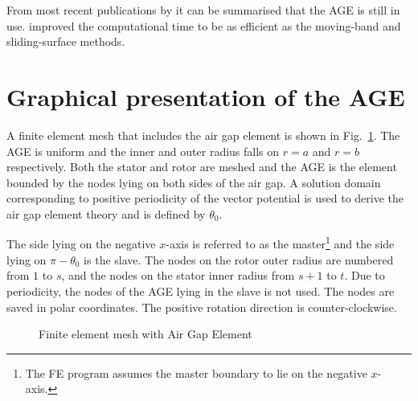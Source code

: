 From most recent publications by \cite{kalokirsis_2005} it can be summarised that the AGE is still 
in use. \cite{de_gersem_2005} improved the computational time to be as efficient as the moving-band 
and sliding-surface methods.

\section{Graphical presentation of the AGE}\label{sec:AGE_element}
A finite element mesh that includes the air gap element is shown in Fig.~\ref{fig:f_mesh}. The AGE 
is uniform and the inner and outer radius falls on $r = a$ and $r = b$ respectively. Both the stator 
and rotor are meshed and the AGE is the element bounded by the nodes lying on both sides of the air 
gap. A solution domain corresponding to positive periodicity of the vector potential is used to derive 
the air gap element theory and is defined by $\theta_0$.

The side lying on the negative $x$-axis is referred to as the master\footnote{The FE program assumes 
the master boundary to lie on the negative $x$-axis.} and the side lying on $\pi-\theta_0$ is the 
slave. The nodes on the rotor outer radius are numbered from $1$ to $s$, and the nodes on the stator 
inner radius from $s+1$ to $t$. Due to periodicity, the nodes of the AGE lying in the slave is not 
used. The nodes are saved in polar coordinates. The positive rotation direction is counter-clockwise.

\begin{figure}
	\centering
		
	\caption{Finite element mesh with Air Gap Element}	
	\label{fig:f_mesh}  
\end{figure}

